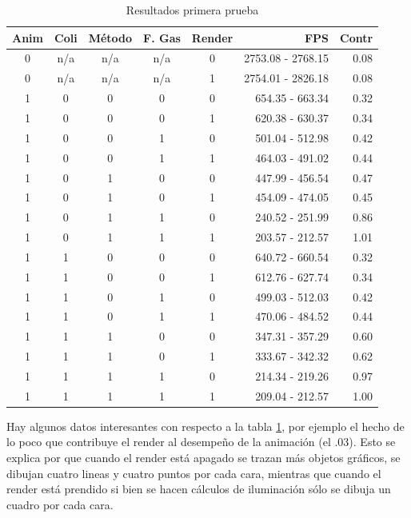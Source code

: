 \begin{table}
\begin{center}
\begin{tabular} {@{}cccccrr@{}}
\toprule
 Anim & Coli & Método & F. Gas & Render & FPS & Contr\\
\midrule
 0 & n/a & n/a & n/a & 0 & 2753.08 - 2768.15 & 0.08\\
 0 & n/a & n/a & n/a & 1 & 2754.01 - 2826.18 & 0.08\\
 1 & 0 & 0 & 0 & 0 & 654.35 - 663.34 & 0.32\\
 1 & 0 & 0 & 0 & 1 & 620.38 - 630.37 & 0.34\\
 1 & 0 & 0 & 1 & 0 & 501.04 - 512.98 & 0.42\\
 1 & 0 & 0 & 1 & 1 & 464.03 - 491.02 & 0.44\\
 1 & 0 & 1 & 0 & 0 & 447.99 - 456.54 & 0.47\\
 1 & 0 & 1 & 0 & 1 & 454.09 - 474.05 & 0.45\\
 1 & 0 & 1 & 1 & 0 & 240.52 - 251.99 & 0.86\\
 1 & 0 & 1 & 1 & 1 & 203.57 - 212.57 & 1.01\\
 1 & 1 & 0 & 0 & 0 & 640.72 - 660.54 & 0.32\\
 1 & 1 & 0 & 0 & 1 & 612.76 - 627.74 & 0.34\\
 1 & 1 & 0 & 1 & 0 & 499.03 - 512.03 & 0.42\\
 1 & 1 & 0 & 1 & 1 & 470.06 - 484.52 & 0.44\\
 1 & 1 & 1 & 0 & 0 & 347.31 - 357.29 & 0.60\\
 1 & 1 & 1 & 0 & 1 & 333.67 - 342.32 & 0.62\\
 1 & 1 & 1 & 1 & 0 & 214.34 - 219.26 & 0.97\\
 1 & 1 & 1 & 1 & 1 & 209.04 - 212.57 & 1.00\\
\bottomrule
\end{tabular}
\end{center}
\caption[Resultados de la prueba del programa]{Resultados primera prueba}
\label{resultado:prueba1}
\end{table}

Hay algunos datos interesantes con respecto a la tabla \ref{resultado:prueba1}, por ejemplo el hecho de lo poco que contribuye el render al desempeño de la animación (el .03).
Esto se explica por que cuando el render está apagado se trazan más objetos gráficos, se dibujan cuatro lineas y cuatro puntos por cada cara, mientras que cuando el render está prendido si bien se hacen cálculos de iluminación sólo se dibuja un cuadro por cada cara.

